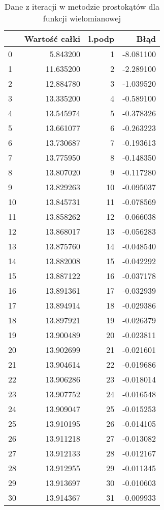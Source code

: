\documentclass[12pt,twoside]{article}
\begin{document}
\begin{table}[H]
\centering 
\caption{Dane z iteracji w metodzie prostokątów dla funkcji wielomianowej}
\label{tabela1.1}
\begin{tabular}{lrrr}
\toprule
{} &  Wartość całki &  l.podp &      Błąd \\
\midrule
0  &       5.843200 &       1 & -8.081100 \\
1  &      11.635200 &       2 & -2.289100 \\
2  &      12.884780 &       3 & -1.039520 \\
3  &      13.335200 &       4 & -0.589100 \\
4  &      13.545974 &       5 & -0.378326 \\
5  &      13.661077 &       6 & -0.263223 \\
6  &      13.730687 &       7 & -0.193613 \\
7  &      13.775950 &       8 & -0.148350 \\
8  &      13.807020 &       9 & -0.117280 \\
9  &      13.829263 &      10 & -0.095037 \\
10 &      13.845731 &      11 & -0.078569 \\
11 &      13.858262 &      12 & -0.066038 \\
12 &      13.868017 &      13 & -0.056283 \\
13 &      13.875760 &      14 & -0.048540 \\
14 &      13.882008 &      15 & -0.042292 \\
15 &      13.887122 &      16 & -0.037178 \\
16 &      13.891361 &      17 & -0.032939 \\
17 &      13.894914 &      18 & -0.029386 \\
18 &      13.897921 &      19 & -0.026379 \\
19 &      13.900489 &      20 & -0.023811 \\
20 &      13.902699 &      21 & -0.021601 \\
21 &      13.904614 &      22 & -0.019686 \\
22 &      13.906286 &      23 & -0.018014 \\
23 &      13.907752 &      24 & -0.016548 \\
24 &      13.909047 &      25 & -0.015253 \\
25 &      13.910195 &      26 & -0.014105 \\
26 &      13.911218 &      27 & -0.013082 \\
27 &      13.912133 &      28 & -0.012167 \\
28 &      13.912955 &      29 & -0.011345 \\
29 &      13.913697 &      30 & -0.010603 \\
30 &      13.914367 &      31 & -0.009933 \\
\bottomrule
\end{tabular}
\end{table}
\end{document}
